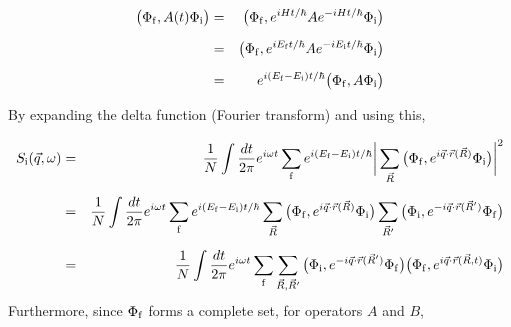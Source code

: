 \documentclass[a4j]{jsarticle}
\begin{document}
\begin{eqnarray}
	\big( \Phi_{\rm f} , A(t) \Phi_{\rm i} \big)
	&=&
	\big( \Phi_{\rm f} , e^{i H t/ \hbar} A e^{-i H t/ \hbar} \Phi_{\rm i} \big)
	\nonumber \\[2mm] &=&
	\big( \Phi_{\rm f} , e^{i E_{\rm f} t/ \hbar} A e^{-i E_{\rm i} t/ \hbar} \Phi_{\rm i} \big)
	\nonumber \\[2mm] &=&
	e^{i ( E_{\rm f} - E_{\rm i} ) t/ \hbar} \big( \Phi_{\rm f} , A \Phi_{\rm i} \big)
\end{eqnarray}

By expanding the delta function (Fourier transform) and using this,


\begin{eqnarray}
	S_{\rm i}(\vec{q},\omega)
	&=&
	\dfrac{1}{N}
	\int \dfrac{ dt }{ 2 \pi }
	e^{ i \omega t }
	\sum_{\rm f}
	e^{ i ( E_{\rm f} - E_{\rm i} ) t / \hbar}
	\bigg|
	\sum_{\vec{R}}
	\big( \Phi_{\rm f} , e^{i \vec{q} \cdot \vec{r}(\vec{R})} \Phi_{\rm i} \big)
	\bigg|^{2}
	\nonumber \\[2mm] &=&
	\dfrac{1}{N}
	\int \dfrac{ dt }{ 2 \pi }
	e^{ i \omega t }
	\sum_{\rm f}
	e^{ i ( E_{\rm f} - E_{\rm i} ) t / \hbar}
	\sum_{\vec{R}}
	\big( \Phi_{\rm f} , e^{i \vec{q} \cdot \vec{r}(\vec{R})} \Phi_{\rm i} \big)
	\sum_{\vec{R}'}
	\big( \Phi_{\rm i} , e^{ - i \vec{q} \cdot \vec{r}(\vec{R}')} \Phi_{\rm f} \big)
	\nonumber \\[2mm] &=&
	\dfrac{1}{N}
	\int \dfrac{ dt }{ 2 \pi }
	e^{ i \omega t }
	\sum_{\rm f}
	\sum_{\vec{R},\vec{R}'}
	\big( \Phi_{\rm i} , e^{ - i \vec{q} \cdot \vec{r}(\vec{R}')} \Phi_{\rm f} \big)
	\big( \Phi_{\rm f} , e^{i \vec{q} \cdot \vec{r}(\vec{R},t)} \Phi_{\rm i} \big)
\end{eqnarray}
Furthermore, since $\Phi_{\rm f}$ forms a complete set, for operators $A$ and $B$,
\end{document}
